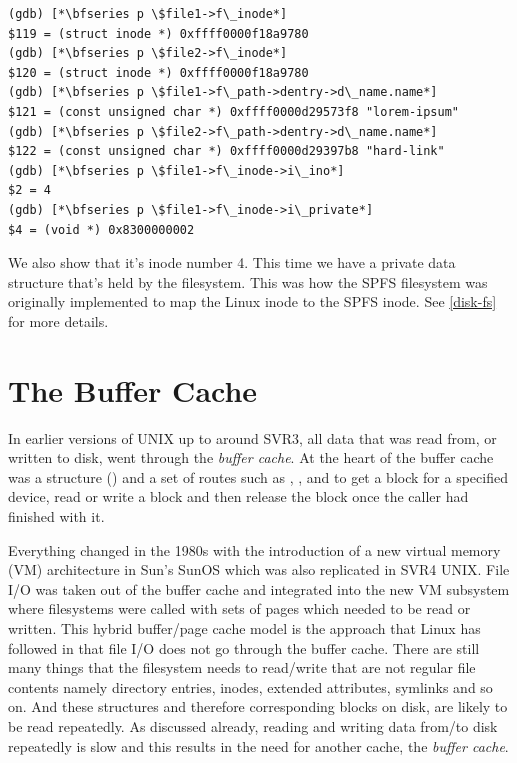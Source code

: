\begin{lstlisting}
(gdb) [*\bfseries p \$file1->f\_inode*]
$119 = (struct inode *) 0xffff0000f18a9780
(gdb) [*\bfseries p \$file2->f\_inode*]
$120 = (struct inode *) 0xffff0000f18a9780
(gdb) [*\bfseries p \$file1->f\_path->dentry->d\_name.name*]
$121 = (const unsigned char *) 0xffff0000d29573f8 "lorem-ipsum"
(gdb) [*\bfseries p \$file2->f\_path->dentry->d\_name.name*]
$122 = (const unsigned char *) 0xffff0000d29397b8 "hard-link"
(gdb) [*\bfseries p \$file1->f\_inode->i\_ino*]
$2 = 4
(gdb) [*\bfseries p \$file1->f\_inode->i\_private*]
$4 = (void *) 0x8300000002
\end{lstlisting}

\noindent
We also show that it's inode number 4. This time we have a private data structure that's held by the filesystem. This was how the SPFS filesystem was originally implemented to map the Linux inode to the SPFS inode. See \ref{disk-fs} for more details.

\section{The Buffer Cache}

In earlier versions of UNIX up to around SVR3, all data that was read from, or written to disk, went through the \textit{buffer cache}. At the heart of the buffer cache was a structure () and a set of routes such as , ,  and  to get a block for a specified device, read or write a block and then release the block once the caller had finished with it.

Everything changed in the 1980s with the introduction of a new virtual memory (VM) architecture in Sun's SunOS which was also replicated in SVR4 UNIX. File I/O was taken out of the buffer cache and integrated into the new VM subsystem where filesystems were called with sets of pages which needed to be read or written. This hybrid buffer/page cache model is the approach that Linux has followed in that file I/O does not go through the buffer cache. There are still many things that the filesystem needs to read/write that are not regular file contents namely directory entries, inodes, extended attributes, symlinks and so on. And these structures and therefore corresponding blocks on disk, are likely to be read repeatedly. As discussed already, reading and writing data from/to disk repeatedly is slow and this results in the need for another cache, the \textit{buffer cache}.

